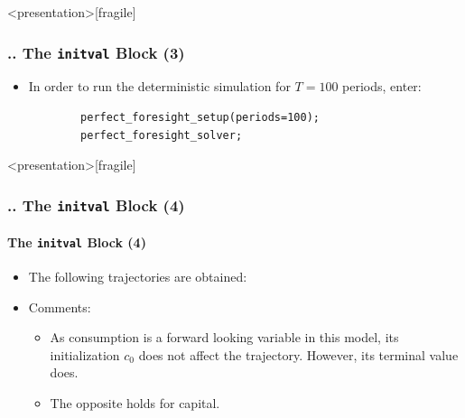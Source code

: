 \documentclass[11pt,aspectratio=169]{beamer}
\begin{document}
\begin{frame}<presentation>[fragile]
	\frametitle{{\thesection.\thesubsection.\thesubsubsection} The \texttt{initval} Block (3)}
	\begin{itemize}
		\item In order to run the deterministic simulation for $T=100$ periods, enter:
		\begin{verbatim}
		perfect_foresight_setup(periods=100);
		perfect_foresight_solver;
		\end{verbatim}
	\end{itemize}
\end{frame}
\begin{frame}<presentation>[fragile]
	\frametitle{{\thesection.\thesubsection.\thesubsubsection} The \texttt{initval} Block (4)}
	\framesubtitle{The \texttt{initval} Block (4)}
	\begin{itemize}
		\item The following trajectories are obtained:
		\begin{figure}
			\centering
			\qquad
			\qquad
		\end{figure}
		\item Comments:
			\begin{itemize}
				\item As consumption is a forward looking variable in this model, its initialization $c_0$ does not affect the trajectory. However, its terminal value does.
				\item The opposite holds for capital. 
			\end{itemize}
	\end{itemize}
\end{frame}
\end{document}
